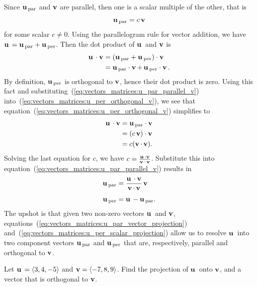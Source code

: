 Since $\operatorname*{\mathbf{u}}{}_{\text{par}}$ and $\operatorname*{\mathbf{v}}$ are parallel, then one
is a scalar multiple of the other, that is
%
\begin{equation}
\label{eq:vectors_matrices:u_par_parallel_v}
\operatorname*{\mathbf{u}}{}_{\text{par}}
=
c\operatorname*{\mathbf{v}}
\end{equation}
%
for some scalar $c \neq 0$. Using the parallelogram rule for vector
addition, we have
$\operatorname*{\mathbf{u}}{} = \operatorname*{\mathbf{u}}{}_{\text{par}} + \operatorname*{\mathbf{u}}{}_{\text{per}}$. Then the dot product of
$\operatorname*{\mathbf{u}}{}$ and $\operatorname*{\mathbf{v}}$ is
%
\begin{equation}
\label{eq:vectors_matrices:u_per_orthogonal_v}
\begin{aligned}
\operatorname*{\mathbf{u}}{} \cdot \operatorname*{\mathbf{v}}
&=
(\operatorname*{\mathbf{u}}{}_{\text{par}} + \operatorname*{\mathbf{u}}{}_{\text{per}}) \cdot \operatorname*{\mathbf{v}} \\
&=
\operatorname*{\mathbf{u}}{}_{\text{par}} \cdot \operatorname*{\mathbf{v}} +
\operatorname*{\mathbf{u}}{}_{\text{per}} \cdot \operatorname*{\mathbf{v}}.
\end{aligned}
\end{equation}
%
By definition, $\operatorname*{\mathbf{u}}{}_{\text{per}}$ is orthogonal to $\operatorname*{\mathbf{v}}$,
hence their dot product is zero. Using this fact and
substituting~(\ref{eq:vectors_matrices:u_par_parallel_v})
into~(\ref{eq:vectors_matrices:u_per_orthogonal_v}), we see that
equation~(\ref{eq:vectors_matrices:u_per_orthogonal_v}) simplifies to
%
\begin{align*}
\operatorname*{\mathbf{u}}{} \cdot \operatorname*{\mathbf{v}}
&=
\operatorname*{\mathbf{u}}{}_{\text{par}} \cdot \operatorname*{\mathbf{v}} \\
&=
(c \operatorname*{\mathbf{v}}) \cdot \operatorname*{\mathbf{v}} \\
&=
c (\operatorname*{\mathbf{v}} \cdot \operatorname*{\mathbf{v}}).
\end{align*}
%
Solving the last equation for $c$, we have $c = \frac {\operatorname*{\mathbf{u}}{} \cdot
\operatorname*{\mathbf{v}}} {\operatorname*{\mathbf{v}} \cdot \operatorname*{\mathbf{v}}}$. Substitute this into
equation~(\ref{eq:vectors_matrices:u_par_parallel_v}) results in
%
\begin{align}
\vecu_{\vecpar}
&=
\frac {\vecu \cdot \vecv} {\vecv \cdot \vecv}
\vecv %
\label{eq:vectors_matrices:u_par_vector_projection} \\[4pt]
\vecu_{\vecper}
&=
\vecu - \vecu_{\vecpar}. %
\label{eq:vectors_matrices:u_per_scalar_projection}
\end{align}
%
The upshot is that given two non-zero vectors $\operatorname*{\mathbf{u}}{}$ and
$\operatorname*{\mathbf{v}}$, equations~(\ref{eq:vectors_matrices:u_par_vector_projection})
and~(\ref{eq:vectors_matrices:u_per_scalar_projection}) allow us to
resolve $\operatorname*{\mathbf{u}}{}$ into two component vectors $\operatorname*{\mathbf{u}}{}_{\text{par}}$ and
$\operatorname*{\mathbf{u}}{}_{\text{per}}$ that are, respectively, parallel and
orthogonal to $\operatorname*{\mathbf{v}}$.

\begin{example}
Let $\operatorname*{\mathbf{u}}{} = \langle 3, 4, -5 \rangle$ and
$\operatorname*{\mathbf{v}} = \langle -7, 8, 9 \rangle$. Find the projection of $\operatorname*{\mathbf{u}}{}$
onto $\operatorname*{\mathbf{v}}$, and a vector that is orthogonal to $\operatorname*{\mathbf{v}}$.
\end{example}

